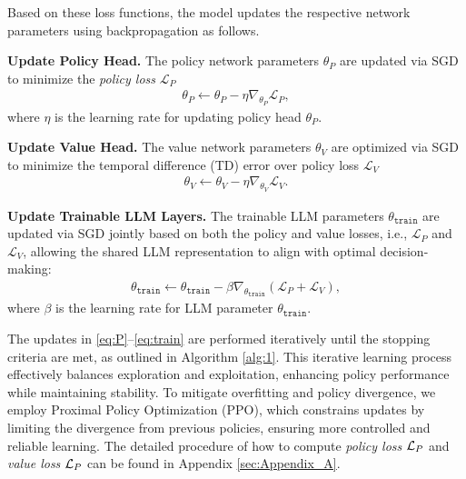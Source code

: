 Based on these loss functions, the model updates the respective network parameters using backpropagation as follows. 

\textbf{Update Policy Head.} 
The policy network parameters 
 $\theta_P$ are updated via SGD to minimize the \emph{policy loss} $\mathcal{L}_P$ 
\begin{align}\label{eq:P}
    \theta_P\leftarrow\theta_P-\eta \nabla_{\theta_P}\mathcal{L}_P,
\end{align}
where $\eta$ is the learning rate for updating policy head $\theta_P$.

\textbf{Update Value Head.} The value network parameters 
$\theta_V$ are optimized via SGD to minimize the temporal difference (TD) error over policy loss $\mathcal{L}_V$
\begin{align}\label{eq:V}
    \theta_V\leftarrow\theta_V-\eta \nabla_{\theta_V}\mathcal{L}_V.
\end{align}

\textbf{Update Trainable LLM Layers.}
The trainable LLM parameters 
$\theta_{\texttt{train}}$ are updated via SGD jointly based on both the policy and value losses, i.e., $\mathcal{L}_P$ and $\mathcal{L}_V$, allowing the shared LLM representation to align with optimal decision-making:  
\begin{align}\label{eq:train}
    \theta_{\texttt{train}}\leftarrow\theta_{\texttt{train}}-\beta \nabla_{\theta_{\texttt{train}}}(\mathcal{L}_P+\mathcal{L}_V),
\end{align}
where $\beta$ is the learning rate for LLM parameter $\theta_{\texttt{train}}$. 

The updates in \eqref{eq:P}–\eqref{eq:train} are performed iteratively until the stopping criteria are met, as outlined in Algorithm \ref{alg:1}. This iterative learning process effectively balances exploration and exploitation, enhancing policy performance while maintaining stability. To mitigate overfitting and policy divergence, we employ Proximal Policy Optimization (PPO), which constrains updates by limiting the divergence from previous policies, ensuring more controlled and reliable learning. The detailed procedure of how to compute \emph{policy loss} $\mathcal{L}_P$ and \emph{value loss} $\mathcal{L}_P$ can be found in Appendix \ref{sec:Appendix_A}.
 






